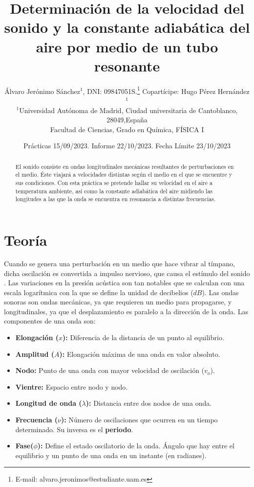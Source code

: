 \documentclass[fleqn,usenatbib,openbib]{mnras}
\title[Velocidad del sonido]{Determinación de la velocidad del sonido y la constante adiabática del aire por medio de un tubo resonante}
\author[Álvaro Jerónimo Sánchez]{
Álvaro Jerónimo Sánchez$^{1}$, DNI: 09847051S.\thanks{E-mail: alvaro.jeronimos@estudiante.uam.es}
Copartícipe: Hugo Pérez Hernández$^{1}$
\\
$^{1}$Universidad Autónoma de Madrid, Ciudad universitaria de Cantoblanco, 28049,España \\
Facultad de Ciencias, Grado en Química, FÍSICA I
}
\date{Prácticas 15/09/2023. Informe 22/10/2023. Fecha Límite 23/10/2023}
\begin{document}
\label{firstpage}
\pagerange{\pageref{firstpage}--\pageref{lastpage}}
\maketitle


\begin{abstract}

El sonido consiste en ondas longitudinales mecánicas resultantes de perturbaciones en el medio. Éste viajará a velocidades distintas según el medio en el que se encuentre y sus condiciones. Con esta práctica se pretende hallar su velocidad en el aire a temperatura ambiente, así como la constante adiabática del aire midiendo las longitudes a las que la onda se encuentra en resonancia a distintas frecuencias.

\vspace{1cm}
\end{abstract}

\section{Teoría}

Cuando se genera una perturbación en un medio que hace vibrar al tímpano, dicha oscilación es convertida a impulso nervioso, que causa el estímulo del sonido \cite{bmc}. Las variaciones en la presión acústica son tan notables que se calculan con una escala logarítmica con la que se define la unidad de decibelios ($dB$). Las ondas sonoras son ondas mecánicas, ya que requieren un medio para propagarse, y longitudinales, ya que el desplazamiento es paralelo a la dirección de la onda. Las componentes de una onda son:

\begin{itemize}
    \item \textbf{Elongación ($x$):} Diferencia de la distancia de un punto al equilibrio.
    \item \textbf{Amplitud ($A$):} Elongación máxima de una onda en valor absoluto. 
    \item \textbf{Nodo:} Punto de una onda con mayor velocidad de oscilación ($v_o$).
    \item \textbf{Vientre:} Espacio entre nodo y nodo.
    \item \textbf{Longitud de onda ($\lambda$):} Distancia entre dos nodos de una onda.
    \item \textbf{Frecuencia ($\nu$):} Número de oscilaciones que ocurren en un tiempo determinado. Su inversa es el \textbf{periodo}.
    \item \textbf{Fase($\phi$):} Define el estado oscilatorio de la onda. Ángulo que hay entre el equilibrio y un punto de una onda en un instante (en radianes).
\end{itemize}
\end{document}
